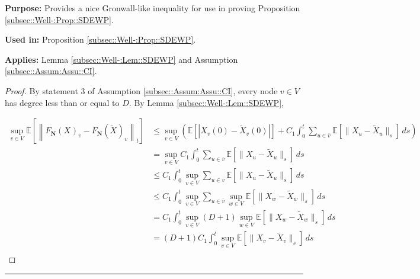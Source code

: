 \documentclass[12pt]{article}
\newcommand{\mb}{\mathbb}
\newcommand{\ov}{\overline}
\newcommand{\purpose}{\textbf{Purpose: }}
\newcommand{\usein}{\textbf{Used in: }}
\newcommand{\app}{\textbf{Applies: }}
\newcommand{\lin}{\rule{\linewidth}{0.4 pt}}
\newcommand{\ex}[1]{\mb{E}\left[#1\right]}			%
\renewcommand{\v}{v}							%
\newcommand{\vv}{u}								%
\newcommand{\vvv}{w}							%
\renewcommand{\t}{t}							%
\renewcommand{\tt}{s}							%
\newcommand{\X}{X}								%
\newcommand{\cind}[1]{_{#1}}					%
\newcommand{\cl}{\ov}							%
\newcommand{\tp}[1]{(#1)}						%
\newcommand{\tip}[1]{#1}						%
\newcommand{\const}{C}							%
\newcommand{\degr}{D}							%
\newcommand{\poisses}{\mathbf{N}}				%
\newcommand{\Fpo}{F_{\poisses}}					%
\newcommand{\alt}[1]{\widetilde{#1}}			%
\newcommand{\indx}[1]{_{#1}}					%
\begin{document}
\purpose Provides a nice Gronwall-like inequality for use in proving Proposition \ref{subsec::Well-:Prop::SDEWP}.

\usein Proposition \ref{subsec::Well-:Prop::SDEWP}.

\app Lemma \ref{subsec::Well-:Lem::SDEWP} and Assumption \ref{subsec::Assum:Assu::CI}.

\begin{proof}
By statement 3 of Assumption \ref{subsec::Assum:Assu::CI}, every node \(v \in V\) has degree less than or equal to \(\degr\). By Lemma \ref{subsec::Well-:Lem::SDEWP},

\begin{align*}
\sup_{\v \in V} \ex{\left\|\Fpo(\X\cind{}\tip{})\cind{\v} - \Fpo(\alt{\X}\cind{}\tip{})\cind{\v}\right\|_\t} &\leq \sup_{\v\in V}\left(\ex{|\X\cind{\v}\tp{0} - \alt{\X}\cind{\v}\tp{0}|} +  \const\indx{1}\int_0^\t \sum_{\vv\in \cl{\v}} \ex{\|\X\cind{\vv}\tip{} - \alt{\X}\cind{\vv}\tip{}\|_\tt}\,d\tt\right)\\
&=\sup_{\v \in V} \const\indx{1}\int_0^\t \sum_{\vv \in \cl{\v}} \ex{\|\X\cind{\vv}\tip{} - \alt{\X}\cind{\vv}\tip{}\|_\tt}\,d\tt\\
&\leq \const\indx{1}\int_0^\t \sup_{\v \in V}\sum_{\vv \in \cl{\v}} \ex{\|\X\cind{\vv}\tip{} - \alt{\X}\cind{\vv}\tip{}\|_\tt}\,d\tt\\
&\leq \const\indx{1}\int_0^\t \sup_{\v \in V}\sum_{\vv \in \cl{\v}}\sup_{\vvv\in V} \ex{\|\X\cind{\vvv}\tip{} - \alt{\X}\cind{\vvv}\tip{}\|_\tt}\,d\tt\\
&= \const\indx{1}\int_0^\t \sup_{\v \in V}(\degr+1)\sup_{\vvv\in V} \ex{\|\X\cind{\vvv}\tip{} - \alt{\X}\cind{\vvv}\tip{}\|_\tt}\,d\tt\\
&= (\degr+1)\const\indx{1}\int_0^\t \sup_{\v\in V} \ex{\|\X\cind{\v}\tip{} - \alt{\X}\cind{\v}\tip{}\|_\tt}\,d\tt\\
\end{align*}
\end{proof}
\lin
\end{document}
